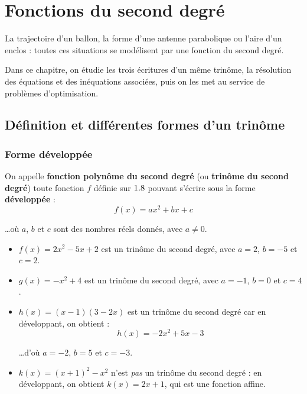 \chapter{Fonctions du second degré}

La trajectoire d'un ballon, la forme d'une antenne parabolique ou l'aire d'un enclos : toutes ces situations se modélisent par une fonction du second degré.

Dans ce chapitre, on étudie les trois écritures d'un même trinôme, la résolution des équations et des inéquations associées, puis on les met au service de problèmes d'optimisation.

\section{Définition et différentes formes d'un trinôme}

\subsection{Forme développée}

\begin{df}
	On appelle \textbf{fonction polynôme du second degré} (ou \textbf{trinôme du second degré}) toute fonction $f$ définie sur $1.8$ pouvant s'écrire sous la forme \textbf{développée} :
	\[
		f(x) = ax^2 + bx + c
	\]

	\ldots où $a$, $b$ et $c$ sont des nombres réels donnés, avec $a \neq 0$.
\end{df}

\begin{ex}
	\nline
	\begin{itemize}
		\item $f(x) = 2x^2 - 5x + 2$ est un trinôme du second degré, avec $a = 2$, $b = -5$ et $c = 2$.
		\item $g(x) = -x^2 + 4$ est un trinôme du second degré, avec $a = -1$, $b = 0$ et $c = 4$.
		\item $h(x) = (x-1)(3-2x)$ est un trinôme du second degré car en développant, on obtient :
		      \[
			      h(x) = -2x^2 + 5x - 3
		      \]

		      \ldots d'où $a = -2$, $b = 5$ et $c = -3$.
		\item $k(x) = (x+1)^2 - x^2$ n'est \emph{pas} un trinôme du second degré : en développant, on obtient $k(x) = 2x + 1$, qui est une fonction affine.
	\end{itemize}
\end{ex}

